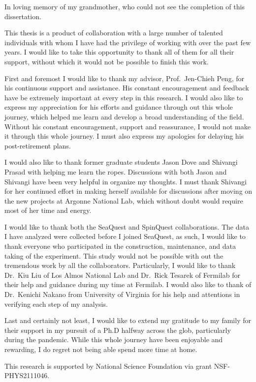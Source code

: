 \documentclass[../main.tex]{subfiles}
\begin{document}
\begin{dedication}
	In loving memory of my grandmother, who could not see the completion of this dissertation.
\end{dedication}

\begin{acknowledgments}
	This thesis is a product of collaboration with a large number of talented
	individuals with whom I have had the privilege of working with over the past
	few years. I would like to take this opportunity to thank all of them for all
	their support, without which it would not be possible to finish this work.

	First and foremost I would like to thank my advisor, Prof.~Jen-Chieh Peng, for
	his continuous support and assistance. His constant encouragement and feedback
	have be extremely important at every step in this research.
	I would also like to express my	appreciation for his efforts and guidance
	through out this whole journey, which helped me learn and develop a broad
	understanding of the field. Without his constant encouragement, support
	and reassurance, I would not  make it through this whole journey.
	I must also express my apologies for delaying his post-retirement plans.

	I would also like to thank former graduate students Jason Dove and Shivangi
	Prasad with helping me learn the ropes. Discussions with both Jason and
	Shivangi have been very helpful in organize my thoughts.
	I must thank Shivangi for her continued effort in making herself available for 
	discussions after moving on the new projects at Argonne National Lab, which
	without doubt would require most of her time and energy.

	I would like to thank both the SeaQuest and SpinQuest collaborations.
	The data I have analyzed were collected before I joined SeaQuest, as such,
	I would like to thank everyone who participated in the construction, maintenance,
	and data taking of the experiment.
	This study would not be possible with out the tremendous work by all the collaborators. 
	Particularly, I would like to thank Dr.~Kiu Liu of Los Almos
	National Lab and Dr.~Rick Tesarek of Fermilab for their help and guidance during
	my time at Fermilab. I would also like to thank of Dr.~Kenichi Nakano from University of Virginia
	for his help and attentions in verifying each step of my analysis.

	Last and certainly not least, I would like to extend my gratitude to my family
	for their support in my pursuit of a Ph.D halfway across the glob, particularly
	during the pandemic. While this whole journey have been enjoyable and rewarding, 
	I do regret not being able spend more time at home.

	This research is supported by National Science Foundation via grant NSF-PHYS2111046.

\end{acknowledgments}
\end{document}
